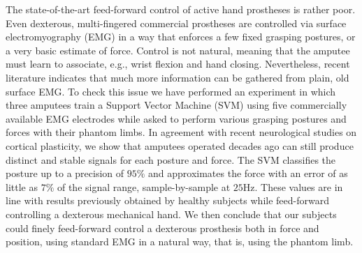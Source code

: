 The state-of-the-art feed-forward control of active hand prostheses
is rather poor. Even dexterous, multi-fingered commercial prostheses are
controlled via surface electromyography (EMG) in a way that enforces
a few fixed grasping postures, or a very basic estimate of force.
Control is not natural, meaning that the amputee must learn to associate,
e.g., wrist flexion and hand closing. Nevertheless, recent literature
indicates that much more information can be gathered from plain, old
surface EMG. To check this issue we have performed an experiment in
which three amputees train a Support Vector Machine (SVM) using five
commercially available EMG electrodes while asked to perform various
grasping postures and forces with their phantom limbs. In agreement
with recent neurological studies on cortical plasticity, we show that
amputees operated decades ago can still produce distinct and stable
signals for each posture and force. The SVM classifies the posture up
to a precision of $95\%$ and approximates the force with an error of
as little as $7\%$ of the signal range, sample-by-sample at $25$Hz.
These values are in line with results previously obtained by healthy
subjects while feed-forward controlling a dexterous mechanical hand.
We then conclude that our subjects could finely feed-forward control
a dexterous prosthesis both in force and position, using standard EMG
in a natural way, that is, using the phantom limb.
